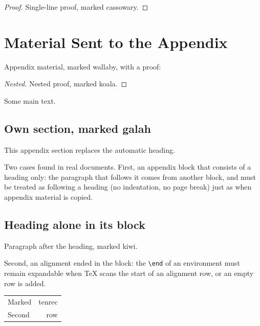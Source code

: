 \documentclass{article}
\begin{document}
\begin{proof}
  Single-line proof, marked cassowary.
\end{proof}

\section{Material Sent to the Appendix}

\begin{toappendix}
  Appendix material, marked wallaby, with a proof:
  \begin{proof}[Nested]
    Nested proof, marked koala.
  \end{proof}
\end{toappendix}

Some main text.

\begin{toappendix}

\section{Own section, marked galah}
This appendix section replaces the automatic heading.
\end{toappendix}

Two cases found in real documents. First, an appendix block that consists of
a heading only: the paragraph that follows it comes from another block, and
must be treated as following a heading (no indentation, no page break) just
as when appendix material is copied.

\begin{toappendix}
  \subsection{Heading alone in its block}
\end{toappendix}
\begin{toappendix}
  Paragraph after the heading, marked kiwi.
\end{toappendix}

Second, an alignment ended in the block: the \verb|\end| of an environment must
remain expandable when \TeX{} scans the start of an alignment row, or an
empty row is added.

\begin{toappendix}
  \begin{center}
    \begin{tabular}{lr}
      \hline
      Marked & tenrec \\
      Second & row \\
      \hline
    \end{tabular}
  \end{center}
\end{toappendix}
\end{document}
